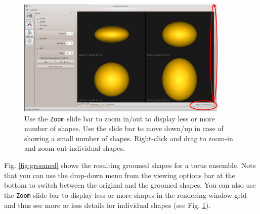 \documentclass[letterpaper,12pt]{article}   %
\begin{document}
\begin{figure}[!htp]
	\centering
	\includegraphics[width=0.9\textwidth]{figs_v2/zoom.png}
	\caption{Use the \texttt{Zoom} slide bar to zoom in/out to display less or more number of shapes. Use the slide bar to move down/up in case of showing a small number of shapes. Right-click and drag to zoom-in and zoom-out individual shapes.}
	\label{fig:zoom}
\end{figure}

\vspace{0.1in}
Fig. \ref{fig:groomed} shows the resulting groomed shapes for a torus ensemble. Note that you can use the drop-down menu from the viewing options bar at the bottom to switch between the original and the groomed shapes. You can also use the \texttt{Zoom} slide bar to display less or more shapes in the rendering window grid and thus see more or less details for individual shapes (see Fig. \ref{fig:zoom}).
\end{document}
